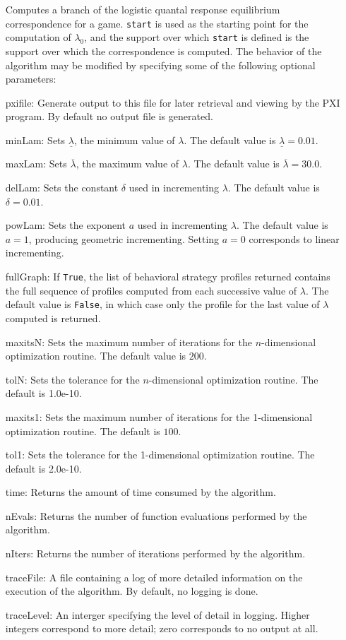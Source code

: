 \begin{itemize}
\bd 
Computes a branch of the logistic quantal response equilibrium
correspondence for a game. \verb+start+ is
used as the starting point for the computation of $\lambda_{0}$, and
the support over which \verb+start+ is defined is the support over
which the correspondence is computed.  The
behavior of the algorithm may be modified by specifying some of the
following optional parameters:
\bd
\item
[pxifile:] Generate output to this file for later retrieval and viewing by
the PXI program.  By default no output file is generated.
\item
[minLam:] Sets $\underline{\lambda}$, the minimum value of $\lambda$.  The 
default value is $\underline{\lambda}=0.01$.
\item
[maxLam:] Sets $\overline{\lambda}$, the maximum value of $\lambda$.  The
default value is $\overline{\lambda}=30.0$.
\item
[delLam:] Sets the constant $\delta$ used in incrementing $\lambda$.  The
default value is $\delta=0.01$.
\item
[powLam:] Sets the exponent $a$ used in incrementing $\lambda$.  The default
value is $a=1$, producing geometric incrementing.  Setting $a=0$ corresponds
to linear incrementing.
\item
[fullGraph:] If \verb+True+, the list of behavioral strategy profiles
returned contains the full sequence of profiles computed from each successive
value of $\lambda$.  The default value is \verb+False+, in which case only
the profile for the last value of $\lambda$ computed is returned.
\item
[maxitsN:] Sets the maximum number of iterations for the $n$-dimensional
optimization routine.  The default value is $200$.
\item
[tolN:] Sets the tolerance for the $n$-dimensional optimization routine.
The default is 1.0e-10.
\item
[maxits1:] Sets the maximum number of iterations for the 1-dimensional
optimization routine.  The default is $100$.
\item
[tol1:] Sets the tolerance for the 1-dimensional optimization routine.
The default is 2.0e-10.
\item
[time:] Returns the amount of time consumed by the
algorithm.
\item
[nEvals:] Returns the number of function evaluations
performed by the algorithm.
\item
[nIters:] Returns the number of iterations performed
by the algorithm.
\item
[traceFile:] A file containing a log of more detailed information on
the execution of the algorithm.  By default, no logging is done.
\item
[traceLevel:] An interger specifying the level of detail in logging.
Higher integers correspond to more detail; zero corresponds to
no output at all.
\ed


\end{itemize}
